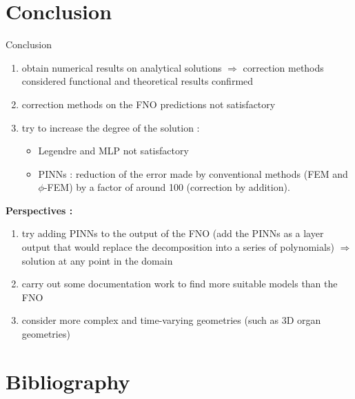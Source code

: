 \documentclass[compress,10pt,xcolor={table,dvipsnames},t]{beamer}
\begin{document}
	\section{Conclusion} %
	
	\begin{frame}{Conclusion}
		\begin{enumerate}[\ding{217}]
			\item obtain numerical results on analytical solutions $\Rightarrow$ correction methods considered functional and theoretical results confirmed
			\item correction methods on the FNO predictions not satisfactory
			\item try to increase the degree of the solution : 
			\begin{itemize}
				\item Legendre and MLP not satisfactory 
				\item PINNs : reduction of the error made by conventional methods (FEM and $\phi$-FEM) by a factor of around 100 (correction by addition). 
			\end{itemize}
		\end{enumerate}
		\textbf{Perspectives :}
		\begin{enumerate}[\ding{217}]
			\item try adding PINNs to the output of the FNO (add the PINNs as a layer output that would replace the decomposition into a series of polynomials) $\Rightarrow$ solution at any point in the domain 
			\item carry out some documentation work to find more suitable models than the FNO
			\item consider more complex and time-varying geometries (such as 3D organ geometries)
		\end{enumerate}
	\end{frame}

	\section{Bibliography}
	
	\begin{frame}[allowframebreaks]{}
		\tiny
		\AtNextBibliography{\tiny}
		\printbibliography[heading=none]
	\end{frame}
\end{document}
